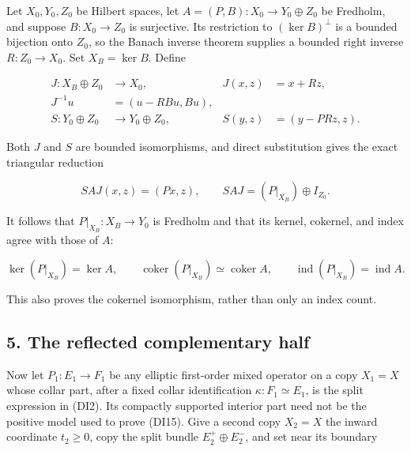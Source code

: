 \documentclass[
  11pt,
]{article}
\makeatletter
\let\ReaderOriginalAnchorStart\hyper@anchorstart
\let\ReaderOriginalAnchorEnd\hyper@anchorend
\let\ReaderPendingAliases\@empty
\def\ReaderArmAliases#1{\gdef\ReaderPendingAliases{#1}}
\def\hyper@anchorstart#1{\ReaderIfNativeAnchorTF{#1}{\ReaderPendingAliases\global\let\ReaderPendingAliases\@empty}{}\ReaderOriginalAnchorStart{#1}}
\makeatother
\begin{document}
Let \(X_0,Y_0,Z_0\) be Hilbert spaces, let
\(A=(P,B):X_0\to Y_0\oplus Z_0\) be Fredholm, and suppose
\(B:X_0\to Z_0\) is surjective. Its restriction to \((\ker B)^\perp\) is
a bounded bijection onto \(Z_0\), so the Banach inverse theorem supplies
a bounded right inverse \(R:Z_0\to X_0\). Set \(X_B=\ker B\). Define

\[
 \begin{aligned}
 J:X_B\oplus Z_0&\longrightarrow X_0,
 &J(x,z)&=x+Rz,\\
 J^{-1}u&=(u-RBu,Bu),\\
 S:Y_0\oplus Z_0&\longrightarrow Y_0\oplus Z_0,
 &S(y,z)&=(y-PRz,z).
 \end{aligned}
 \tag{DI16}
\]

Both \(J\) and \(S\) are bounded isomorphisms, and direct substitution
gives the exact triangular reduction

\[
 SAJ(x,z)=(Px,z),\qquad
 SAJ=(P|_{X_B})\oplus I_{Z_0}.
 \tag{DI17}
\]

It follows that \(P|_{X_B}:X_B\to Y_0\) is Fredholm and that its kernel,
cokernel, and index agree with those of \(A\):

\[
 \ker(P|_{X_B})=\ker A,\qquad
 \operatorname{coker}(P|_{X_B})\simeq\operatorname{coker}A,\qquad
 \operatorname{ind}(P|_{X_B})=\operatorname{ind}A.
 \tag{DI18}
\]

This also proves the cokernel isomorphism, rather than only an index
count.

\ReaderArmAliases{\ReaderOriginalAnchorStart{AN03-SDI-005}\ReaderOriginalAnchorEnd\begingroup\expandafter\def\csname @currentHref\endcsname{AN03-SDI-005}\label{AN03-SDI-005}\endgroup\ReaderOriginalAnchorStart{5-the-reflected-complementary-half}\ReaderOriginalAnchorEnd\begingroup\expandafter\def\csname @currentHref\endcsname{5-the-reflected-complementary-half}\label{5-the-reflected-complementary-half}\endgroup\ReaderOriginalAnchorStart{the-reflected-complementary-half}\ReaderOriginalAnchorEnd}
\subsection{5. The reflected complementary
half}\label{the-reflected-complementary-half}

Now let \(P_1:E_1\to F_1\) be any elliptic first-order mixed operator on
a copy \(X_1=X\) whose collar part, after a fixed collar identification
\(\kappa:F_1\simeq E_1\), is the split expression in (DI2). Its
compactly supported interior part need not be the positive model used to
prove (DI15). Give a second copy \(X_2=X\) the inward coordinate
\(t_2\geq0\), copy the split bundle \(E_2^+\oplus E_2^-\), and set near
its boundary
\end{document}
